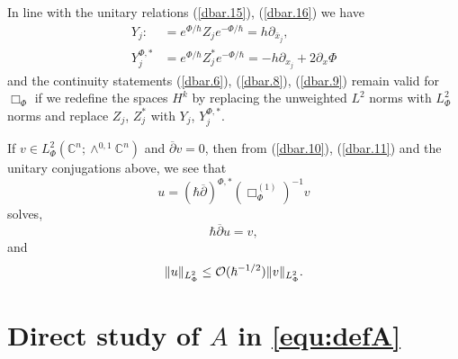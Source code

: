 \documentclass{article}
\newcommand{\CM}{\mathbb{C}}
\newcommand{\h}{\hbar}
\begin{document}
\par In line with the unitary relations (\ref{dbar.15}),
(\ref{dbar.16}) we have
\begin{equation}\label{dbar.18}
  \begin{split}
    Y_j:&=e^{\Phi /\h}Z_je^{-\Phi /\h}=h\partial _{\bar{x}_j},\\
    Y_j^{\Phi ,*}&=e^{\Phi /\h}Z_j^*e^{-\Phi /\h}=-h\partial
    _{x_j}+2\partial _x\Phi
  \end{split}
\end{equation} 
and the continuity statements (\ref{dbar.6}), (\ref{dbar.8}),
(\ref{dbar.9}) remain valid for $\Box_\Phi $ if we redefine the spaces
$H^k$ by replacing the unweighted $L^2$ norms with $L^2_\Phi $ norms
and replace $Z_j$, $Z_j^*$ with $Y_j$, $Y_j^{\Phi ,*}$.

\par If $v\in L^2_\Phi (\CM^n;\wedge^{0,1}\CM^n)$ and
$\overline{\partial }v=0$, then from (\ref{dbar.10}), (\ref{dbar.11})
and the unitary conjugations above, we see that
\[
u= (\h\overline{\partial })^{\Phi ,*}(\Box_\Phi ^{(1)})^{-1}v
\]
solves,
\begin{equation}\label{dbar.12}
  \h \overline{\partial }u=v,
\end{equation}
and
\begin{equation}\label{dbar.13}
  \| u\|_{L^2_\Phi }\le {\cal O}(\h ^{-1/2})\| v\|_{L^2_\Phi }.
\end{equation}
  
\section{Direct study of \texorpdfstring{$A$}{A} in
  \texorpdfstring{\eqref{equ:defA}}{equ:defA}}
\label{dsa}
\end{document}
